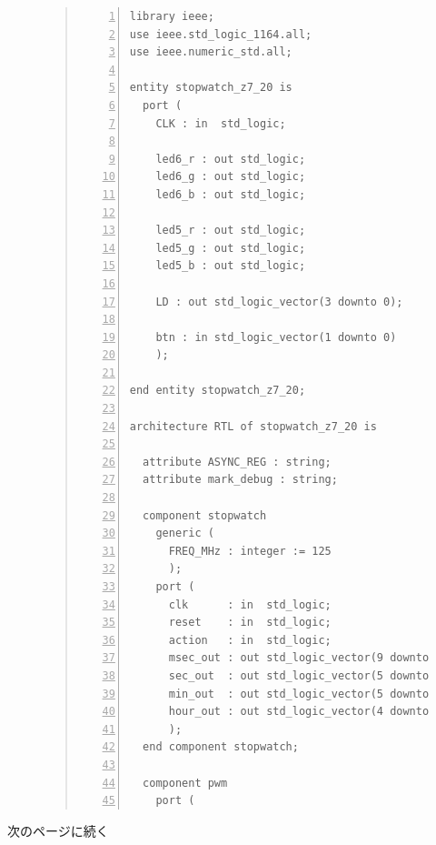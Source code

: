 \documentclass[a4paper,dvipdfmx]{jsarticle}
\begin{document}
\begin{figure}[H]
\begin{quote}
\begin{Verbatim}[frame=single, numbers=left, baselinestretch=0.8]
library ieee;
use ieee.std_logic_1164.all;
use ieee.numeric_std.all;

entity stopwatch_z7_20 is
  port (
    CLK : in  std_logic;

    led6_r : out std_logic;
    led6_g : out std_logic;
    led6_b : out std_logic;
    
    led5_r : out std_logic;
    led5_g : out std_logic;
    led5_b : out std_logic;

    LD : out std_logic_vector(3 downto 0);
    
    btn : in std_logic_vector(1 downto 0)
    );
  
end entity stopwatch_z7_20;

architecture RTL of stopwatch_z7_20 is

  attribute ASYNC_REG : string;
  attribute mark_debug : string;

  component stopwatch
    generic (
      FREQ_MHz : integer := 125
      );
    port (
      clk      : in  std_logic;
      reset    : in  std_logic;
      action   : in  std_logic;
      msec_out : out std_logic_vector(9 downto 0);
      sec_out  : out std_logic_vector(5 downto 0);
      min_out  : out std_logic_vector(5 downto 0);
      hour_out : out std_logic_vector(4 downto 0)
      );
  end component stopwatch;

  component pwm
    port (
\end{Verbatim}
\end{quote}
\end{figure}
次のページに続く
\end{document}
